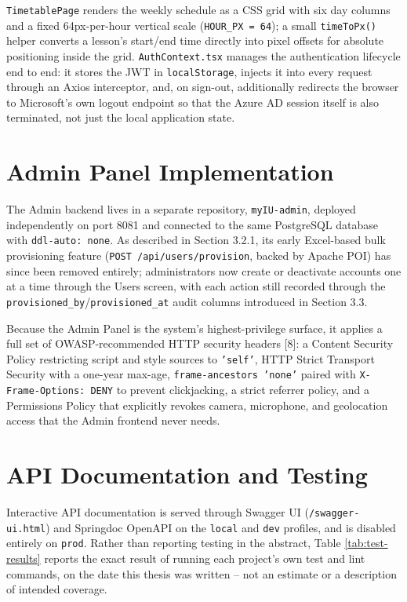 \documentclass[12pt,a4paper]{report}
\begin{document}
\texttt{TimetablePage} renders the weekly schedule as a CSS grid with
six day columns and a fixed 64px-per-hour vertical scale
(\texttt{HOUR\_PX = 64}); a small \texttt{timeToPx()} helper converts a
lesson's start/end time directly into pixel offsets for absolute
positioning inside the grid. \texttt{AuthContext.tsx} manages the
authentication lifecycle end to end: it stores the JWT in
\texttt{localStorage}, injects it into every request through an Axios
interceptor, and, on sign-out, additionally redirects the browser to
Microsoft's own logout endpoint so that the Azure AD session itself is
also terminated, not just the local application state.

\section{Admin Panel Implementation}

The Admin backend lives in a separate repository, \texttt{myIU-admin},
deployed independently on port 8081 and connected to the same
PostgreSQL database with \texttt{ddl-auto: none}. As described in
Section 3.2.1, its early Excel-based bulk provisioning feature
(\texttt{POST /api/users/provision}, backed by Apache POI) has since
been removed entirely; administrators now create or deactivate accounts
one at a time through the Users screen, with each action still recorded
through the \texttt{provisioned\_by}/\texttt{provisioned\_at} audit
columns introduced in Section 3.3.

Because the Admin Panel is the system's highest-privilege surface, it
applies a full set of OWASP-recommended HTTP security headers [8]: a
Content Security Policy restricting script and style sources to
\texttt{'self'}, HTTP Strict Transport Security with a one-year max-age,
\texttt{frame-ancestors 'none'} paired with \texttt{X-Frame-Options:
DENY} to prevent clickjacking, a strict referrer policy, and a
Permissions Policy that explicitly revokes camera, microphone, and
geolocation access that the Admin frontend never needs.

\section{API Documentation and Testing}

Interactive API documentation is served through Swagger UI
(\texttt{/swagger-ui.html}) and Springdoc OpenAPI on the \texttt{local}
and \texttt{dev} profiles, and is disabled entirely on \texttt{prod}.
Rather than reporting testing in the abstract, Table
\ref{tab:test-results} reports the exact result of running each
project's own test and lint commands, on the date this thesis was
written -- not an estimate or a description of intended coverage.
\end{document}
